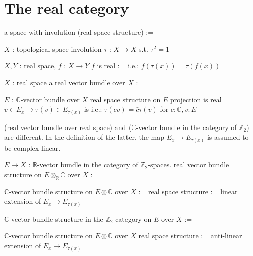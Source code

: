 \documentclass[dvipdfmx]{jsarticle}
\begin{document}
\section*{The real category}

\begin{Definition}
\itemdefi
  \Define a space with involution (real space structure) :=
  \begin{itemize}
    \itembase \(X\) : topological space
    \itemenum involution \(\tau\) : \(X \to X\) s.t. \(\tau^2=1\)
  \end{itemize}
\end{Definition}

\begin{Definition}
\itemwhen
  \For \(X,Y\) : real space, \(f\) : \(X \to Y\)
\itemdefi
  \Define \(f\) is real :=  i.e.: \(f(\tau(x)) = \tau(f(x))\)
\end{Definition}

\begin{Definition}
\itemwhen
  \For \(X\) : real space
\itemdefi
  \Define a real vector bundle over \(X\) :=
  \begin{itemize}
    \itembase \(E\) : \(\mathbb{C}\)-vector bundle over \(X\)
    \itemenum real space structure on \(E\)
    \itemwith projection is real
    \itemwith \(v \in E_x \to \tau(v) \in E_{\tau(x)}\) is  i.e.: \(\tau(cv) = \bar{c} \tau(v)\) for \(c:\mathbb{C}, v:E\)
  \end{itemize}
\itemnote
  (real vector bundle over real space) and (\(\mathbb{C}\)-vector bundle in the category of \(\mathbb{Z}_2\)) are different. In the definition of the latter, the map \(E_x \to E_{\tau (x)}\) is assumed to be complex-linear.
\end{Definition}

\begin{Definition}
\itemwhen
  \For \(E \to X\) : \(\mathbb{R}\)-vector bundle in the category of \(\mathbb{Z}_2\)-spaces.
\itemdefi
  \Define real vector bundle structure on \(E \otimes_{\mathbb{R}} \mathbb{C}\) over \(X\) :=
  \begin{itemize}
    \itembase \(\mathbb{C}\)-vector bundle structure on \(E \otimes \mathbb{C}\) over \(X\) := 
    \itemenum real space structure := linear extension of \(E_{x} \to E_{\tau(x)}\)
  \end{itemize}
  \Define \(\mathbb{C}\)-vector bundle structure in the \(\mathbb{Z}_2\) category on \(E\) over \(X\) :=
  \begin{itemize}
    \itembase \(\mathbb{C}\)-vector bundle structure on \(E \otimes \mathbb{C}\) over \(X\)
    \itemenum real space structure := anti-linear extension of \(E_{x} \to E_{\tau(x)}\)
  \end{itemize}
\end{Definition}
\end{document}
